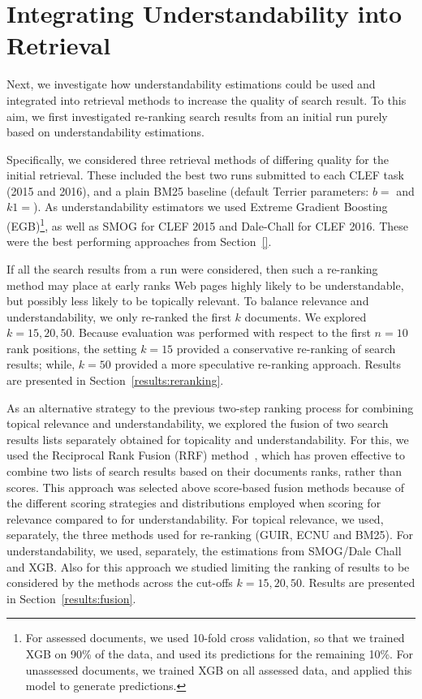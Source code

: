 \section{Integrating Understandability into Retrieval}
\label{sec:experiments}

Next, we investigate how understandability estimations could be used and integrated into retrieval methods to increase the quality of search result. To this aim, we first investigated re-ranking search results from an initial run purely based on understandability estimations. 

Specifically, we considered three retrieval methods of differing quality for the initial retrieval. These included the best two runs submitted to each CLEF task (2015 and 2016), and a plain BM25 baseline (default Terrier parameters: $b=$ and $k1=$). As understandability estimators we used  Extreme Gradient Boosting (EGB)\footnote{For assessed documents, we used 10-fold cross validation, so that we trained XGB on 90\% of the data, and used its predictions for the remaining 10\%. For unassessed documents, we trained XGB on all assessed data, and applied this model to generate predictions.}, as well as SMOG for CLEF 2015 and Dale-Chall for CLEF 2016. These were the best performing approaches from Section~\ref{}.

If all the search results from a run were considered, then such a re-ranking method may place at early ranks Web pages highly likely to be understandable, but possibly less likely to be topically relevant. To balance relevance and understandability, we only re-ranked the first $k$ documents. We explored $k = 15, 20, 50$. Because evaluation was performed with respect to the first $n=10$ rank positions, the setting $k=15$ provided a conservative re-ranking of search results; while, $k=50$ provided a more speculative re-ranking approach. Results are presented in Section~\ref{results:reranking}.

As an alternative strategy to the previous two-step ranking process for combining topical relevance and understandability, we explored the fusion of two search results lists separately obtained for topicality and understandability.  For this, we used the Reciprocal Rank Fusion (RRF) method~\cite{cormack09}, which has proven effective to combine two lists of search results based on their documents ranks, rather than scores. This approach was selected above score-based fusion methods because of the different scoring strategies and distributions employed when scoring for relevance compared to for understandability. For topical relevance, we used, separately, the three methods used for re-ranking (GUIR, ECNU and BM25). For understandability, we used, separately, the estimations from SMOG/Dale Chall and XGB. Also for this approach we studied limiting the ranking of results to be considered by the methods across the cut-offs $k=15, 20, 50$. Results are presented in Section~\ref{results:fusion}.

